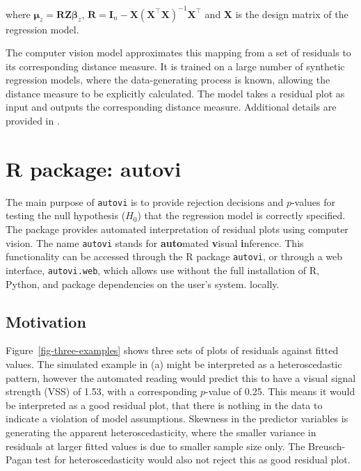 \documentclass[
doublespace,
  times]{anzsauth}
\begin{document}
where
\(\boldsymbol{\mu}_z = \boldsymbol{R}\boldsymbol{Z}\boldsymbol{\beta}_z\),
\(\boldsymbol{R} = \boldsymbol{I}_n - \boldsymbol{X}(\boldsymbol{X}^\top\boldsymbol{X})^{-1}\boldsymbol{X}^\top\)
and \(\boldsymbol{X}\) is the design matrix of the regression model.

The computer vision model approximates this mapping from a set of
residuals to its corresponding distance measure. It is trained on a
large number of synthetic regression models, where the data-generating
process is known, allowing the distance measure to be explicitly
calculated. The model takes a residual plot as input and outputs the
corresponding distance measure. Additional details are provided in
\citet{li2024automated}.

\section{R package: autovi}\label{sec-autovi}

The main purpose of \texttt{autovi} is to provide rejection decisions
and \(p\)-values for testing the null hypothesis (\(H_0\)) that the
regression model is correctly specified. The package provides automated
interpretation of residual plots using computer vision. The name
\texttt{autovi} stands for \textbf{auto}mated \textbf{v}isual
\textbf{i}nference. This functionality can be accessed through the R
package \texttt{autovi}, or through a web interface,
\texttt{autovi.web}, which allows use without the full installation of
R, Python, and package dependencies on the user's system. locally.

\subsection{Motivation}\label{sec-why}

Figure~\ref{fig-three-examples} shows three sets of plots of residuals
against fitted values. The simulated example in (a) might be interpreted
as a heteroscedastic pattern, however the automated reading would
predict this to have a visual signal strength (VSS) of 1.53, with a
corresponding \(p\)-value of 0.25. This means it would be interpreted as
a good residual plot, that there is nothing in the data to indicate a
violation of model assumptions. Skewness in the predictor variables is
generating the apparent heteroscedasticity, where the smaller variance
in residuals at larger fitted values is due to smaller sample size only.
The Breusch-Pagan test \citep{breusch1979simple} for heteroscedasticity
would also not reject this as good residual plot.
\end{document}
